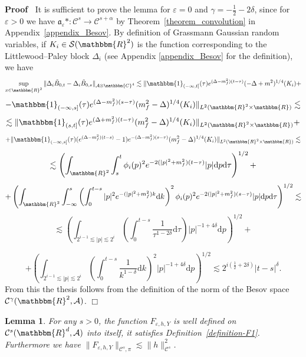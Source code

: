 \documentclass[11pt]{article}
\newcommand{\asterisk}{\mathord{*}}
\newcommand{\mathd}{\mathrm{d}}
\newcommand{\nobracket}{}
\newenvironment{proof}{\noindent\textbf{Proof\ }}{\hspace*{\fill}$\Box$\medskip}
\newtheorem{lemma}{Lemma}
\begin{document}
\begin{proof}
  It is sufficient to prove the lemma for $\varepsilon = 0$ and $\gamma = -
  \frac{1}{2} - 2 \delta$, since for $\varepsilon > 0$ we have
  $\mathfrak{a}_{\varepsilon} \asterisk : \mathcal{C}^s \rightarrow
  \mathcal{C}^{s + \alpha}$ by Theorem~\ref{theorem_convolution} in
  Appendix~\ref{appendix_Besov}. By definition of Grassmann Gaussian random
  variables, if $K_i \in \mathcal{S} (\mathbbm{R}^2)$ is the function
  corresponding to the Littlewood--Paley block $\Delta_i$ (see Appendix
  \ref{appendix_Besov} for the definition), we have
  \[ \sup_{x \in \mathbbm{R}^2} \| \Delta_i \tilde{B}_{0, t} - \Delta_i
     \tilde{B}_{0, s} \|_{\mathcal{A} \otimes \mathbbm{C}^4} \lesssim \|
     \mathbbm{1}_{(- \infty, t]} (\tau) e^{(\Delta - m_f^2) (t - \tau)} (-
     \Delta + m^2)^{1 / 4} (K_i) + \nobracket \]
  \[ \nobracket \nobracket -\mathbbm{1}_{(- \infty, s]} (\tau) e^{(\Delta -
     m_f^2) (s - \tau)} (m^2_f - \Delta)^{1 / 4} (K_i) \| \nobracket_{L^2
     (\mathbbm{R}^2 \times \mathbbm{R})} \lesssim \]
  \[ \lesssim \| \mathbbm{1}_{(s, t]} (\tau) e^{(\Delta + m_f^2) (t - \tau)}
     (m^2_f - \Delta)^{1 / 4} (K_i) \|_{L^2 (\mathbbm{R}^2 \times \mathbbm{R})}
     + \]
  \[ + \| \mathbbm{1}_{(- \infty, s]} (\tau) (e^{(\Delta - m_f^2) (t - s)} - 1)
     e^{- (\Delta - m_f^2) (s - \tau)} (m^2_f - \Delta)^{1 / 4} (K_i) \|_{L^2
     (\mathbbm{R}^2 \times \mathbbm{R})} \lesssim \]
  \[ \lesssim \left( \int_{\mathbbm{R}^2} \int_s^t \phi_i (p)^2 e^{- 2 (| p |^2
     + m_f^2) (t - \tau)} | p | \mathd p \mathd \tau \right)^{1 / 2} + \]
  \[ + \left( \int_{\mathbbm{R}^2} \int_{- \infty}^s \left( \int_0^{t - s} | p
     |^2 e^{- (| p |^2 + m_f^2) k} \mathd k^{} \right)^2 \phi_i (p)^2 e^{- 2
     (| p |^2 + m_f^2) (s - \tau)} | p | \mathd p \mathd \tau \right)^{1 / 2}
     \lesssim \]
  \[ \lesssim \left( \int_{2^{i - 1} \lesssim | p | \lesssim 2^i} \left(
     \int_0^{t - s} \frac{1}{\tau^{1 - 2 \delta}} \mathd \tau \right) | p |^{-
     1 + 4 \delta} \mathd p \right)^{1 / 2} + \]
  
  \[ + \left( \int_{2^{i - 1} \lesssim | p | \lesssim 2^i} \left( \int_0^{t -
     s} \frac{1}{k^{1 - \delta}} \mathd k \right)^2 | p |^{- 1 + 4 \delta}
     \mathd p \right)^{1 / 2} \lesssim 2^{i \left( \frac{1}{2} + 2 \delta
     \right)} | t - s |^{\delta} . \]
  From this the thesis follows from the definition of the norm of the Besov
  space $\mathcal{C}^{\gamma} (\mathbbm{R}^2, \mathcal{A})$.
\end{proof}

\begin{lemma}
  \label{lemma_drift}For any $s > 0$, the function $F_{\varepsilon, h, Y}$ is
  well defined on $\mathcal{C}^s (\mathbbm{R}^d, \mathcal{A})$ into itself, it
  satisfies Definition~\ref{definition-F1}. Furthermore we have $\|
  F_{\varepsilon, h, Y} \|_{\mathcal{C}^s, \pi} \lesssim \| h
  \|_{\mathcal{C}^s}^2$.
\end{lemma}
\end{document}
